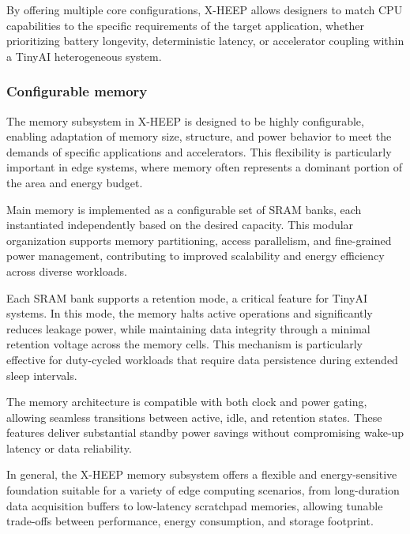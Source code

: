                 By offering multiple core configurations, \mbox{X-HEEP} allows designers to match CPU capabilities to the specific requirements of the target application, whether prioritizing battery longevity, deterministic latency, or accelerator coupling within a TinyAI heterogeneous system.
                
            \subsubsection*{Configurable memory}
            
                The memory subsystem in \mbox{X-HEEP} is designed to be highly configurable, enabling adaptation of memory size, structure, and power behavior to meet the demands of specific applications and accelerators. This flexibility is particularly important in edge systems, where memory often represents a dominant portion of the area and energy budget.
                
                Main memory is implemented as a configurable set of SRAM banks, each instantiated independently based on the desired capacity. This modular organization supports memory partitioning, access parallelism, and fine-grained power management, contributing to improved scalability and energy efficiency across diverse workloads.
                
                Each SRAM bank supports a retention mode, a critical feature for TinyAI systems. In this mode, the memory halts active operations and significantly reduces leakage power, while maintaining data integrity through a minimal retention voltage across the memory cells. This mechanism is particularly effective for duty-cycled workloads that require data persistence during extended sleep intervals.
                
                The memory architecture is compatible with both clock and power gating, allowing seamless transitions between active, idle, and retention states. These features deliver substantial standby power savings without compromising wake-up latency or data reliability.
                
                In general, the \mbox{X-HEEP} memory subsystem offers a flexible and energy-sensitive foundation suitable for a variety of edge computing scenarios, from long-duration data acquisition buffers to low-latency scratchpad memories, allowing tunable trade-offs between performance, energy consumption, and storage footprint.

